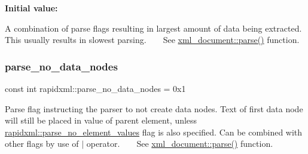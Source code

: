 {\bfseries Initial value\+:}
\begin{DoxyCode}{0}

\end{DoxyCode}
A combination of parse flags resulting in largest amount of data being extracted. This usually results in slowest parsing. ~\newline
~\newline
 See \mbox{\hyperlink{classrapidxml_1_1xml__document_ac6e73ff9ac323bf5a370c38feb03a6b1}{xml\+\_\+document\+::parse()}} function. \mbox{\label{namespacerapidxml_ac2d21ef14a4e8936b94aca5d38b1a74d}} 
\subsubsection{\texorpdfstring{parse\_no\_data\_nodes}{parse\_no\_data\_nodes}}
{\footnotesize\ttfamily const int rapidxml\+::parse\+\_\+no\+\_\+data\+\_\+nodes = 0x1}

Parse flag instructing the parser to not create data nodes. Text of first data node will still be placed in value of parent element, unless \mbox{\hyperlink{namespacerapidxml_a00e6fea134b786ea6efeed1c8bc4a668}{rapidxml\+::parse\+\_\+no\+\_\+element\+\_\+values}} flag is also specified. Can be combined with other flags by use of $\vert$ operator. ~\newline
~\newline
 See \mbox{\hyperlink{classrapidxml_1_1xml__document_ac6e73ff9ac323bf5a370c38feb03a6b1}{xml\+\_\+document\+::parse()}} function. \mbox{\label{namespacerapidxml_a00e6fea134b786ea6efeed1c8bc4a668}} 
